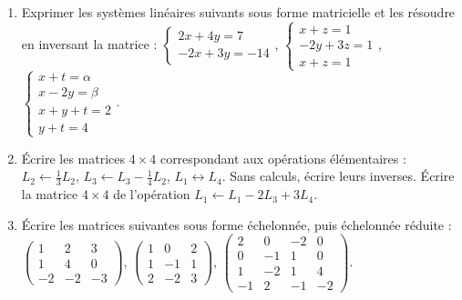 \documentclass[class=report,crop=false]{standalone}
\begin{document}

\begin{miniexercices}
\sauteligne
\begin{enumerate}
  \item Exprimer les systèmes linéaires suivants sous forme matricielle
  et les résoudre en inversant la matrice :
  $\left\{\begin{array}{l}2x+4y=7\\-2x+3y=-14\end{array} \right.$,\quad
  $\left\{\begin{array}{l}x+z=1\\-2y+3z=1\\x+z=1\end{array} \right.$,\quad
  $\left\{\begin{array}{l}x+t=\alpha\\x-2y=\beta\\x+y+t=2\\y+t=4\end{array} \right.$.


  \item \'Ecrire les matrices $4\times 4$ correspondant aux opérations élémentaires :
  $L_2 \leftarrow \frac13 L_2$, $L_3 \leftarrow L_3-\frac14 L_2$, $L_1 \leftrightarrow L_4$.
  Sans calculs, écrire leurs inverses. \'Ecrire la matrice $4\times 4$
  de l'opération $L_1 \leftarrow L_1-2L_3+3L_4$.

  \item \'Ecrire les matrices suivantes sous forme échelonnée, puis échelonnée réduite :
  $\left(\begin{smallmatrix}1&2&3\\1&4&0\\-2&-2&-3\end{smallmatrix}\right)$,
  $\left(\begin{smallmatrix}1&0&2\\1&-1&1\\2&-2&3\end{smallmatrix}\right)$,
  $\left(\begin{smallmatrix}2&0&-2&0\\0&-1&1&0\\1&-2&1&4\\-1&2&-1&-2\end{smallmatrix}\right)$.

\end{enumerate}
\end{miniexercices}
\end{document}
